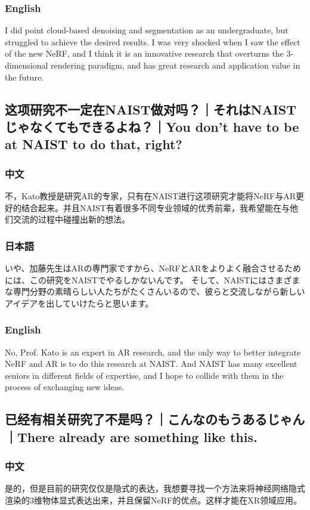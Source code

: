 \documentclass[lang=cn,11pt,a4paper]{elegantpaper}
\begin{document}
\subsubsection{English}
I did point cloud-based denoising and segmentation as an undergraduate, but struggled to achieve the desired results. I was very shocked when I saw the effect of the new NeRF, and I think it is an innovative research that overturns the 3-dimensional rendering paradigm, and has great research and application value in the future.

\subsection{这项研究不一定在NAIST做对吗？｜それはNAISTじゃなくてもできるよね？｜You don't have to be at NAIST to do that, right?}
\subsubsection{中文}
不，Kato教授是研究AR的专家，只有在NAIST进行这项研究才能将NeRF与AR更好的结合起来。并且NAIST有着很多不同专业领域的优秀前辈，我希望能在与他们交流的过程中碰撞出新的想法。
\subsubsection{日本語}
いや、加藤先生はARの専門家ですから、NeRFとARをよりよく融合させるためには、この研究をNAISTでやるしかないんです。 そして、NAISTにはさまざまな専門分野の素晴らしい人たちがたくさんいるので、彼らと交流しながら新しいアイデアを出していけたらと思います。
\subsubsection{English}
No, Prof. Kato is an expert in AR research, and the only way to better integrate NeRF and AR is to do this research at NAIST. And NAIST has many excellent seniors in different fields of expertise, and I hope to collide with them in the process of exchanging new ideas.

\subsection{已经有相关研究了不是吗？｜こんなのもうあるじゃん｜There already are something like this.}
\subsubsection{中文}
是的，但是目前的研究仅仅是隐式的表达，我想要寻找一个方法来将神经网络隐式渲染的3维物体显式表达出来，并且保留NeRF的优点。这样才能在XR领域应用。
\end{document}
